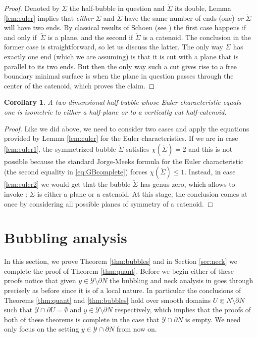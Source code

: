 \documentclass[10pt]{amsart}
\let\mathcal\mathscr
\newcounter{cas}
\newtheorem{cor}[thm]{Corollary}
\theoremstyle{definition}
\let\cemb\Subset
\begin{document}
\begin{proof}
Denoted by $\Sigma$ the half-bubble in question and $\check{\Sigma}$ its double, Lemma \ref{lem:euler} implies that \emph{either} $\Sigma$ and $\check{\Sigma}$ have the same number of ends (one) \emph{or} $\check{\Sigma}$ will have two ends. By classical results of Schoen (see \cite{Sc83}) the first case happens if and only if~$\check{\Sigma}$ is a plane, and the second if $\check{\Sigma}$ is a catenoid. The conclusion in the former case is straightforward, so let us discuss the latter. The only way $\Sigma$ has exactly one end (which we are assuming) is that it is cut with a plane that is parallel to its two ends. But then the only way such a cut gives rise to a free boundary minimal surface is when the plane in question passes through the center of the catenoid, which proves the claim.
\end{proof}

\begin{cor}\label{cor:genuszero}
A two-dimensional half-bubble whose Euler characteristic equals one is isometric to either a half-plane or to a vertically cut half-catenoid.
\end{cor}

\begin{proof}
Like we did above, we need to consider two cases and apply the equations provided by Lemma \ref{lem:euler} for the Euler characteristics. If we are in case \eqref{lem:euler1}, the symmetrized bubble $\check{\Sigma}$ satisfies $\chi(\check{\Sigma})=2$ and this is not possible because the standard Jorge-Meeks formula for the Euler characteristic (\cf the second equality in \eqref{eq:GBcomplete}) forces $\chi(\check{\Sigma})\leq 1$.
Instead, in case \eqref{lem:euler2} we would get that the bubble $\check{\Sigma}$ has genus zero, which allows to invoke \cite{LR91}: $\check{\Sigma}$ is either a plane or a catenoid. At this stage, the conclusion comes at once by considering all possible planes of symmetry of a catenoid.
\end{proof}
\enlargethispage{-\baselineskip}%

\section{Bubbling analysis}\label{sec:bubbling}

In this section, we prove Theorem \ref{thm:bubbles} and in Section \ref{sec:neck} we complete the proof of Theorem \ref{thm:quant}. Before we begin either of these proofs notice that given $y\in \mathcal{Y}\setminus \partial N$ the bubbling and neck analysis in \cite{BS17} goes through precisely as before since it is of a local nature. In particular the conclusions of Theorems \ref{thm:quant} and \ref{thm:bubbles} hold over smooth domains $U\cemb N\setminus\partial N$ such that $\mathcal{Y}\cap \partial U =\emptyset$ and $y\in \mathcal{Y}\setminus \partial N$ respectively, which implies that the proofs of both of these theorems is complete in the case that $\mathcal{Y}\cap \partial N$ is empty. We need only focus on the setting $y\in \mathcal{Y}\cap \partial N$ from now on.
\end{document}
